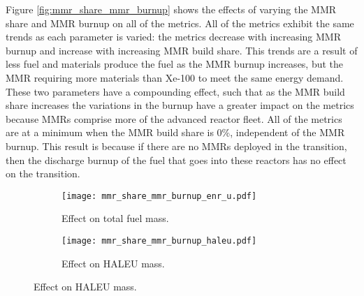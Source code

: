 Figure \ref{fig:mmr_share_mmr_burnup} shows the effects of varying 
the \gls{MMR} share and \gls{MMR} burnup on all of the metrics. All of 
the metrics exhibit the same trends as each parameter is varied: the 
metrics decrease with increasing \gls{MMR} burnup and increase 
with increasing \gls{MMR} build share. This trends are a result of 
less fuel and materials produce the fuel as the \gls{MMR} burnup increases, 
but the \gls{MMR} requiring more materials than Xe-100 to meet the same 
energy demand. These two parameters have a 
compounding effect, such that as the \gls{MMR} build share increases 
the variations in the burnup have a greater impact on the metrics because 
\glspl{MMR} comprise more of the advanced reactor fleet. All of the metrics 
are at a minimum when the \gls{MMR} build share is 0\%, independent of 
the \gls{MMR} burnup. This result is because if there are no \glspl{MMR} 
deployed in the transition, then the discharge burnup of the fuel that 
goes into these reactors has no effect on the transition. 


\begin{figure}
    \begin{subfigure}[t]{0.48\textwidth}
        \centering
        \texttt{[image: mmr\_share\_mmr\_burnup\_enr\_u.pdf]}
        \caption{Effect on total fuel mass.}
        \label{fig:mmr_share_mmr_burnup_enr_u}
    \end{subfigure}
    \hfill
    \begin{subfigure}[t]{0.48\textwidth}
        \centering
        \texttt{[image: mmr\_share\_mmr\_burnup\_haleu.pdf]}
        \caption{Effect on HALEU mass.}
        \label{fig:mmr_share_mmr_burnup_haleu}
    \end{subfigure}
\end{figure}

